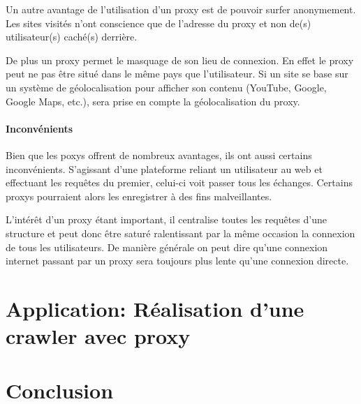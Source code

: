 \documentclass[hideweeklyreports,noposter]{polytech/polytech}
\begin{document}
				Un autre avantage de l'utilisation d'un proxy est de pouvoir surfer anonymement. Les sites visités n'ont conscience que de l'adresse du proxy et non de(s) utilisateur(s) caché(s) derrière.
				
				De plus un proxy permet le masquage de son lieu de connexion. En effet le proxy peut ne pas être situé dans le même pays que l'utilisateur.
				Si un site se base sur un système de géolocalisation pour afficher son contenu (YouTube, Google, Google Maps, etc.), sera prise en compte la géolocalisation du proxy.
				
			\subsection{Inconvénients}
				Bien que les poxys offrent de nombreux avantages, ils ont aussi certains inconvénients.
				S'agissant d'une plateforme reliant un utilisateur au web et effectuant les requêtes du premier, celui-ci voit passer tous les échanges.
				Certains proxys pourraient alors les enregistrer à des fins malveillantes.
				
				L'intérêt d'un proxy étant important, il centralise toutes les requêtes d'une structure et peut donc être saturé ralentissant par la même occasion la connexion de tous les utilisateurs.
				De manière générale on peut dire qu'une connexion internet passant par un proxy sera toujours plus lente qu'une connexion directe.
		
\part{Application: Réalisation d'une crawler avec proxy}
\part{Conclusion}

\appendix		
\end{document}
